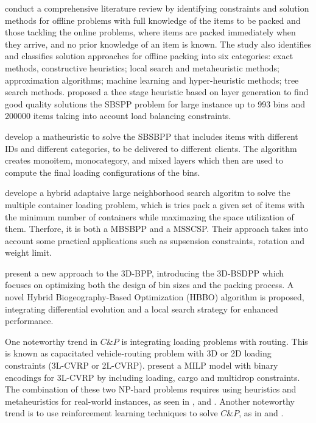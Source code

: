 \autocite{Ali2022On-lineApproaches} conduct a comprehensive literature review by identifying constraints and solution methods for offline problems with full knowledge of the items to be packed and those tackling the online problems, where items are packed immediately when they arrive, and no prior knowledge of an item is known. The study also identifies and classifies solution approaches for offline packing into six categories: exact methods, constructive heuristics; local search and metaheuristic methods; approximation algorithms; machine learning and hyper-heuristic methods; tree search methods.
\autocite{Harrath2022} proposed a thee stage heuristic based on layer generation to find good quality solutions  the SBSPP problem for large instance up to 993 bins and 200000 items taking into account load balancing constraints.


\autocite{Tresca2022} develop a matheuristic to solve the SBSBPP that includes items with different IDs and different categories, to be delivered to different clients. The algorithm creates monoitem, monocategory, and mixed layers which then are used to compute the final loading configurations of the bins.

\autocite{Li2022} develope a hybrid adaptaive large neighborhood search algoritm to solve the multiple container loading problem, which is tries pack a given set of items with the minimum number of containers while maximazing the space utilization of them. Therfore, it is both a MBSBPP and a MSSCSP. Their approach takes into account some practical applications such as supsension constraints, rotation and weight limit.

\autocite{Chen2023}  present a new approach to the 3D-BPP, introducing the 3D-BSDPP which focuses on optimizing both the design of bin sizes and the packing process. A novel Hybrid Biogeography-Based Optimization (HBBO) algorithm is proposed, integrating differential evolution and a local search strategy for enhanced performance.



One noteworthy trend in $C\&P$ is integrating loading problems with routing. This is known as capacitated vehicle-routing problem with 3D or 2D loading constraints (3L-CVRP or 2L-CVRP). \autocite{Junqueira2012Three-dimensionalConstraints} present a MILP model with binary encodings for 3L-CVRP by including loading, cargo and multidrop constraints. The combination of these two NP-hard problems requires using heuristics and metaheuristics for real-world instances, as seen in \autocite{Dominguez2016UsingFleet}, \autocite{Alonso2022TheRevision} and \autocite{Wei2015AConstraints}. Another noteworthy trend is to use reinforcement learning techniques to solve $C\&P$, as in \autocite{Que2023SolvingLearning} and \autocite{Zhao2022LearningPacking}.


